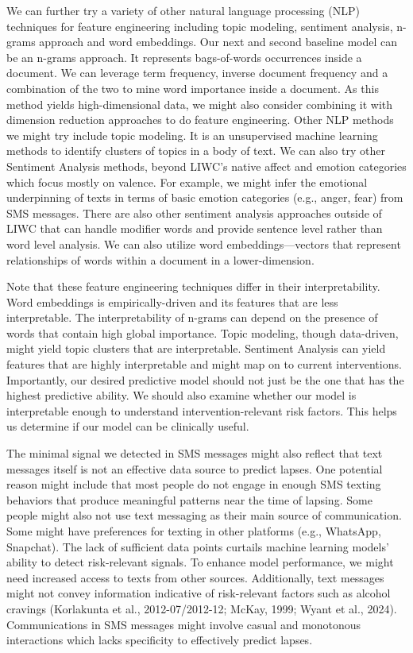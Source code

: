 \documentclass[
  letterpaper,
  DIV=11,
  numbers=noendperiod]{scrartcl}
\begin{document}
We can further try a variety of other natural language processing (NLP)
techniques for feature engineering including topic modeling, sentiment
analysis, n-grams approach and word embeddings. Our next and second
baseline model can be an n-grams approach. It represents bags-of-words
occurrences inside a document. We can leverage term frequency, inverse
document frequency and a combination of the two to mine word importance
inside a document. As this method yields high-dimensional data, we might
also consider combining it with dimension reduction approaches to do
feature engineering. Other NLP methods we might try include topic
modeling. It is an unsupervised machine learning methods to identify
clusters of topics in a body of text. We can also try other Sentiment
Analysis methods, beyond LIWC's native affect and emotion categories
which focus mostly on valence. For example, we might infer the emotional
underpinning of texts in terms of basic emotion categories (e.g., anger,
fear) from SMS messages. There are also other sentiment analysis
approaches outside of LIWC that can handle modifier words and provide
sentence level rather than word level analysis. We can also utilize word
embeddings---vectors that represent relationships of words within a
document in a lower-dimension.

Note that these feature engineering techniques differ in their
interpretability. Word embeddings is empirically-driven and its features
that are less interpretable. The interpretability of n-grams can depend
on the presence of words that contain high global importance. Topic
modeling, though data-driven, might yield topic clusters that are
interpretable. Sentiment Analysis can yield features that are highly
interpretable and might map on to current interventions. Importantly,
our desired predictive model should not just be the one that has the
highest predictive ability. We should also examine whether our model is
interpretable enough to understand intervention-relevant risk factors.
This helps us determine if our model can be clinically useful.

The minimal signal we detected in SMS messages might also reflect that
text messages itself is not an effective data source to predict lapses.
One potential reason might include that most people do not engage in
enough SMS texting behaviors that produce meaningful patterns near the
time of lapsing. Some people might also not use text messaging as their
main source of communication. Some might have preferences for texting in
other platforms (e.g., WhatsApp, Snapchat). The lack of sufficient data
points curtails machine learning models' ability to detect risk-relevant
signals. To enhance model performance, we might need increased access to
texts from other sources. Additionally, text messages might not convey
information indicative of risk-relevant factors such as alcohol cravings
(Korlakunta et al., 2012-07/2012-12; McKay, 1999; Wyant et al., 2024).
Communications in SMS messages might involve casual and monotonous
interactions which lacks specificity to effectively predict lapses.
\end{document}
